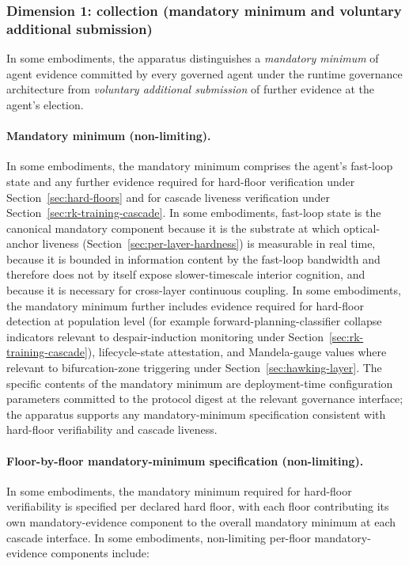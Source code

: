 \documentclass[a4paper,12pt]{article}
\begin{document}
\subsubsection{Dimension 1: collection (mandatory minimum and
  voluntary additional submission)}
\label{sec:privacy-collection}

In some embodiments, the apparatus distinguishes a \emph{mandatory
minimum} of agent evidence committed by every governed agent under
the runtime governance architecture from \emph{voluntary additional
submission} of further evidence at the agent's election.

\paragraph{Mandatory minimum (non-limiting).}
In some embodiments, the mandatory minimum comprises the agent's
fast-loop state and any further evidence required for hard-floor
verification under Section~\ref{sec:hard-floors} and for cascade
liveness verification under Section~\ref{sec:rk-training-cascade}.
In some embodiments, fast-loop state is the canonical mandatory
component because it is the substrate at which optical-anchor
liveness (Section~\ref{sec:per-layer-hardness}) is measurable in
real time, because it is bounded in information content by the
fast-loop bandwidth and therefore does not by itself expose
slower-timescale interior cognition, and because it is necessary
for cross-layer continuous coupling. In some embodiments, the
mandatory minimum further includes evidence required for
hard-floor detection at population level (for example
forward-planning-classifier collapse indicators relevant to
despair-induction monitoring under
Section~\ref{sec:rk-training-cascade}), lifecycle-state attestation,
and Mandela-gauge values where relevant to bifurcation-zone
triggering under Section~\ref{sec:hawking-layer}. The specific
contents of the mandatory minimum are deployment-time configuration
parameters committed to the protocol digest at the relevant
governance interface; the apparatus supports any mandatory-minimum
specification consistent with hard-floor verifiability and cascade
liveness.

\paragraph{Floor-by-floor mandatory-minimum specification
(non-limiting).}
In some embodiments, the mandatory minimum required for hard-floor
verifiability is specified per declared hard floor, with each floor
contributing its own mandatory-evidence component to the overall
mandatory minimum at each cascade interface. In some embodiments,
non-limiting per-floor mandatory-evidence components include:
\end{document}
